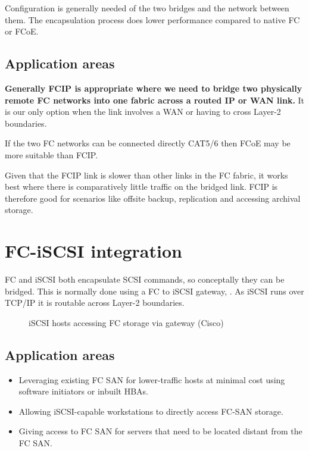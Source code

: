Configuration is generally needed of the two bridges and the network
between them. The encapsulation process does lower performance compared
to native FC or FCoE.

\subsection{Application areas}\label{application-areas-1}

\textbf{Generally FCIP is appropriate where we need to bridge two
physically remote FC networks into one fabric across a routed IP or WAN
link.} It is our only option when the link involves a WAN or having to
cross Layer-2 boundaries.

If the two FC networks can be connected directly CAT5/6 then FCoE may be
more suitable than FCIP.

Given that the FCIP link is slower than other links in the FC fabric, it
works best where there is comparatively little traffic on the bridged
link. FCIP is therefore good for scenarios like offsite backup,
replication and accessing archival storage.

\section{FC-iSCSI integration}\label{fc-iscsi-integration}

FC and iSCSI both encapsulate SCSI commands, so conceptally they can be
bridged. This is normally done using a FC to iSCSI gateway, . As iSCSI
runs over TCP/IP it is routable across Layer-2 boundaries.

\begin{figure}
\centering
\caption{iSCSI hosts accessing FC storage via gateway (Cisco){}}
\end{figure}

\subsection{Application areas}\label{application-areas-2}

\begin{itemize}
\item
  Leveraging existing FC SAN for lower-traffic hosts at minimal cost
  using software initiators or inbuilt HBAs.
\item
  Allowing iSCSI-capable workstations to directly access FC-SAN storage.
\item
  Giving access to FC SAN for servers that need to be located distant
  from the FC SAN.
\end{itemize}
